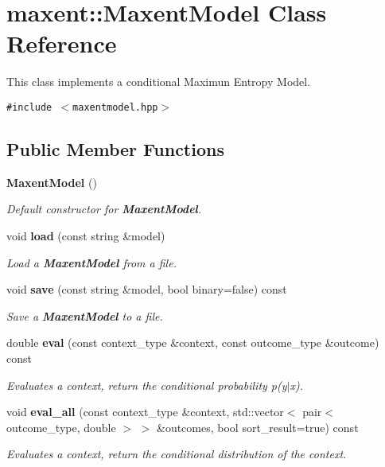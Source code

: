 \section{maxent::Maxent\-Model Class Reference}
\label{classmaxent_1_1MaxentModel}
This class implements a conditional Maximun Entropy Model.  


{\tt \#include $<$maxentmodel.hpp$>$}

\subsection*{Public Member Functions}
\begin{CompactItemize}
\item 
{\bf Maxent\-Model} ()
\begin{CompactList}\small\item\em Default constructor for {\bf Maxent\-Model}. \item\end{CompactList}\item 
void {\bf load} (const string \&model)
\begin{CompactList}\small\item\em Load a {\bf Maxent\-Model} from a file. \item\end{CompactList}\item 
void {\bf save} (const string \&model, bool binary=false) const
\begin{CompactList}\small\item\em Save a {\bf Maxent\-Model} to a file. \item\end{CompactList}\item 
double {\bf eval} (const context\_\-type \&context, const outcome\_\-type \&outcome) const
\begin{CompactList}\small\item\em Evaluates a context, return the conditional probability p(y$|$x). \item\end{CompactList}\item 
void {\bf eval\_\-all} (const context\_\-type \&context, std::vector$<$ pair$<$ outcome\_\-type, double $>$ $>$ \&outcomes, bool sort\_\-result=true) const
\begin{CompactList}\small\item\em Evaluates a context, return the conditional distribution of the context. \item\end{CompactList}\item 

\end{CompactItemize}

